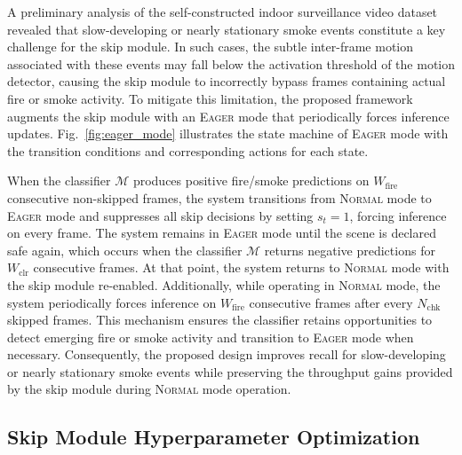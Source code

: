 \documentclass[final,3p,times,twocolumn]{elsarticle}
\begin{document}
A preliminary analysis of the self-constructed indoor surveillance video
dataset revealed that slow-developing or nearly stationary smoke events
constitute a key challenge for the skip module. In such cases, the
subtle inter-frame motion associated with these events may fall below
the activation threshold of the motion detector, causing the skip
module to incorrectly bypass frames containing actual fire or smoke
activity. To mitigate this limitation, the proposed framework augments
the skip module with an \textsc{Eager} mode that periodically forces
inference updates. Fig.~\ref{fig:eager_mode} illustrates the state
machine of \textsc{Eager} mode with the transition conditions and
corresponding actions for each state.

When the classifier $\mathcal{M}$ produces positive fire/smoke
predictions on $W_{\text{fire}}$ consecutive non-skipped frames, the
system transitions from \textsc{Normal} mode to \textsc{Eager} mode and
suppresses all skip decisions by setting $s_t = 1$, forcing inference on
every frame. The system remains in \textsc{Eager} mode until the scene
is declared safe again, which occurs when the classifier $\mathcal{M}$
returns negative predictions for $W_{\text{clr}}$ consecutive frames. At
that point, the system returns to \textsc{Normal} mode with the skip
module re-enabled. Additionally, while operating in \textsc{Normal}
mode, the system periodically forces inference on $W_{\text{fire}}$
consecutive frames after every $N_{\text{chk}}$ skipped frames. This
mechanism ensures the classifier retains opportunities to detect
emerging fire or smoke activity and transition to \textsc{Eager} mode
when necessary. Consequently, the proposed design improves recall for
slow-developing or nearly stationary smoke events while preserving the
throughput gains provided by the skip module during \textsc{Normal}
mode operation.

\subsection{Skip Module Hyperparameter Optimization}\label{sec:hyperparam}
\end{document}
